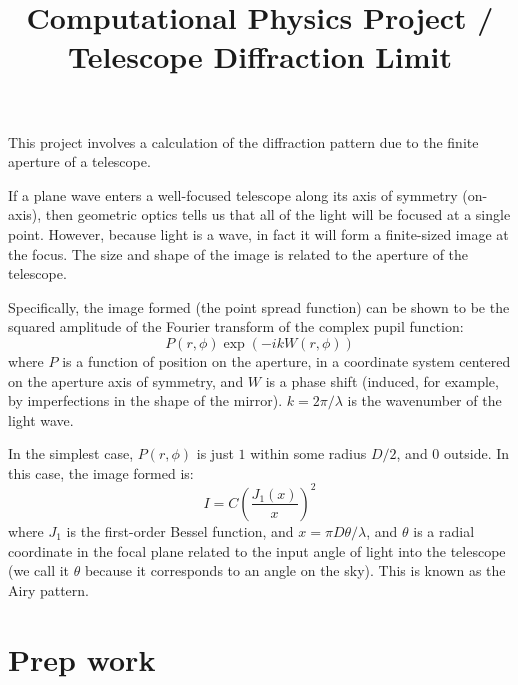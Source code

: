 \documentclass[11pt, preprint]{aastex}
\begin{document}
\title{\bf Computational Physics Project / Telescope Diffraction Limit}

This project involves a calculation of the diffraction pattern due to
the finite aperture of a telescope.

If a plane wave enters a well-focused telescope along its axis of
symmetry (on-axis), then geometric optics tells us that all of the
light will be focused at a single point. However, because light is a
wave, in fact it will form a finite-sized image at the focus. The size
and shape of the image is related to the aperture of the telescope.

Specifically, the image formed (the point spread function) can be
shown to be the squared amplitude of the Fourier transform of the
complex pupil function:
\begin{equation}
P(r, \phi) \exp\left(-ik W(r,\phi)\right)
\end{equation}
where $P$ is a function of position on the aperture, in a coordinate
system centered on the aperture axis of symmetry, and $W$ is a phase
shift (induced, for example, by imperfections in the shape of the
mirror). $k= 2\pi/\lambda$ is the wavenumber of the light wave.

In the simplest case, $P(r, \phi)$ is just $1$ within some radius
$D/2$, and $0$ outside.  In this case, the image formed is:
\begin{equation}
I = C\left(\frac{J_1(x)}{x}\right)^2
\end{equation}
where $J_1$ is the first-order Bessel function, and $x=\pi
D\theta/\lambda$, and $\theta$ is a radial coordinate in the focal
plane related to the input angle of light into the telescope (we call
it $\theta$ because it corresponds to an angle on the sky). This is
known as the Airy pattern.

\section{Prep work}
\end{document}
